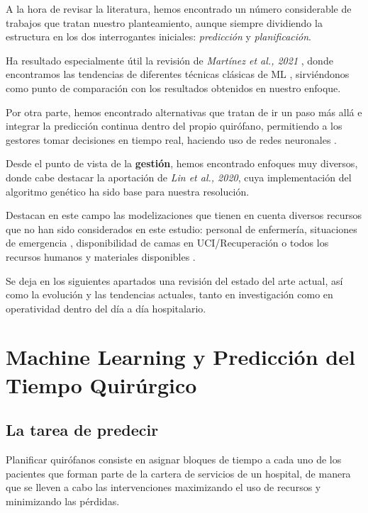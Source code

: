 

A la hora de revisar la literatura, hemos encontrado un número considerable de trabajos que tratan nuestro planteamiento, aunque siempre dividiendo la estructura en los dos interrogantes iniciales: \textit{predicción} y \textit{planificación}.

Ha resultado especialmente útil la revisión de \textit{Martínez et al., 2021} \cite{Martinez2021MachinePrediction} , donde encontramos las tendencias de diferentes técnicas clásicas de ML , sirviéndonos como punto de comparación con los resultados obtenidos en nuestro enfoque.

Por otra parte, hemos encontrado alternativas que tratan de ir un paso más allá e integrar la predicción continua dentro del propio quirófano, permitiendo a los gestores tomar decisiones en tiempo real, haciendo uso de redes neuronales \cite{Jiao2022ContinuousNetwork}.

Desde el punto de vista de la \textbf{gestión}, hemos encontrado enfoques muy diversos, donde cabe destacar la aportación de  \textit{Lin et al., 2020}\cite{Lin2020AScheduling}, cuya implementación del algoritmo genético ha sido base para nuestra resolución.

Destacan en este campo las modelizaciones que tienen en cuenta diversos recursos que no han sido considerados en este estudio: personal de enfermería\cite{DiMartinelly2014AnScheduling}, situaciones de emergencia \cite{Nouaouri2011OperatingDisaster}, disponibilidad de camas en UCI/Recuperación \cite{Celik2023APrinciple} o todos los recursos humanos y materiales disponibles \cite{Bargetto2023AConstraints}.

Se deja en los siguientes apartados una revisión del estado del arte actual, así como la evolución y las tendencias actuales, tanto en investigación como en operatividad dentro del día a día hospitalario.
\newpage

\section{Machine Learning y Predicción del Tiempo Quirúrgico}

\subsection{La tarea de predecir}

Planificar quirófanos consiste en asignar bloques de tiempo a cada uno de los pacientes que forman parte de la cartera de servicios de un hospital, de manera que se lleven a cabo las intervenciones maximizando el uso de recursos y minimizando las pérdidas.

